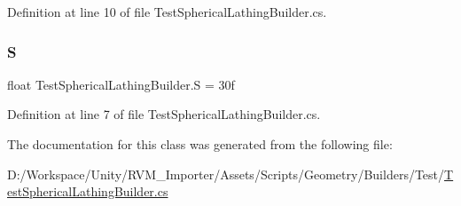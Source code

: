 Definition at line 10 of file Test\+Spherical\+Lathing\+Builder.\+cs.

\mbox{\label{class_test_spherical_lathing_builder_aa81e26148cebdd81ba7067d292ffacbd}} 
\subsubsection{\texorpdfstring{S}{S}}
{\footnotesize\ttfamily float Test\+Spherical\+Lathing\+Builder.\+S = 30f}



Definition at line 7 of file Test\+Spherical\+Lathing\+Builder.\+cs.



The documentation for this class was generated from the following file\+:\begin{DoxyCompactItemize}
\item 
D\+:/\+Workspace/\+Unity/\+R\+V\+M\+\_\+\+Importer/\+Assets/\+Scripts/\+Geometry/\+Builders/\+Test/\mbox{\hyperlink{_test_spherical_lathing_builder_8cs}{Test\+Spherical\+Lathing\+Builder.\+cs}}\end{DoxyCompactItemize}
